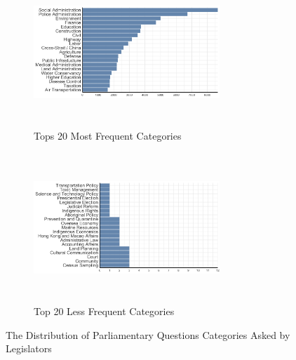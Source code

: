 \begin{figure}[hb!]
    \centering
    \begin{subfigure}[t]{0.48\textwidth}
    \includegraphics[width=7cm, height=5.6cm]{03-Chapter-Three/image/top20.png}
    \caption{Tops 20 Most Frequent Categories} 
    \label{fig:top20}
    \end{subfigure}
    \centering
    \begin{subfigure}[t]{0.48\textwidth}
    \includegraphics[width=7cm, height=5.6cm]{03-Chapter-Three/image/tail20.png}
    \caption{Top 20 Less Frequent Categories}
    \label{fig:tail20}    
    \end{subfigure}
    \caption{The Distribution of Parliamentary Questions Categories Asked by Legislators}
    \label{fig:discriptionpq}    
\end{figure}
